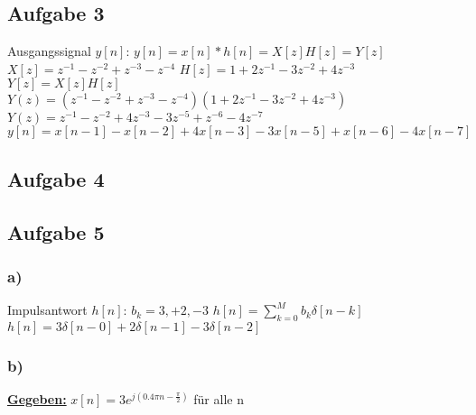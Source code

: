 \documentclass[12pt]{scrreprt}
\begin{document}
\subsection*{Aufgabe 3}
Ausgangssignal $y[n]$:\newline
\hspace*{5mm}$y[n]=x[n]*h[n] = X[z]H[z] = Y[z]$\newline
\hspace*{5mm}$X[z]=z^{-1} - z^{-2} + z^{-3} - z^{-4}$\newline
\hspace*{5mm}$H[z]=1 + 2z^{-1} - 3z^{-2} + 4z^{-3}$\newline
\hspace*{5mm}$Y[z]=X[z]H[z]$\newline
\hspace*{5mm}$Y(z)= (z^{-1} - z^{-2} + z^{-3} - z^{-4})(1 + 2z^{-1} - 3z^{-2} + 4z^{-3})$\newline
\hspace*{5mm}$Y(z)=z^{-1}-z^{-2}+4z^{-3}-3z^{-5}+z^{-6}-4z^{-7}$\newline
\hspace*{5mm}$y[n]=x[n-1]-x[n-2]+4x[n-3]-3x[n-5]+x[n-6]-4x[n-7]$\newline

\subsection*{Aufgabe 4}


\subsection*{Aufgabe 5}
\subsubsection*{a)}
Impulsantwort $h[n]$:\newline
\hspace*{5mm}$b_k={3, +2, -3}$\newline
\hspace*{5mm}$h[n]=\sum_{k=0}^{M}b_k\delta[n-k]$\newline
\hspace*{5mm}$h[n]=3\delta[n-0] + 2\delta[n-1] - 3\delta[n-2]$\newline

\subsubsection*{b)}
\underline{\textbf{Gegeben:}}\newline
\hspace*{5mm}$x[n]=3e^{j(0.4\pi n - \frac{\pi}{2})}$ für alle n\newline
\hspace*{5mm}
\end{document}
